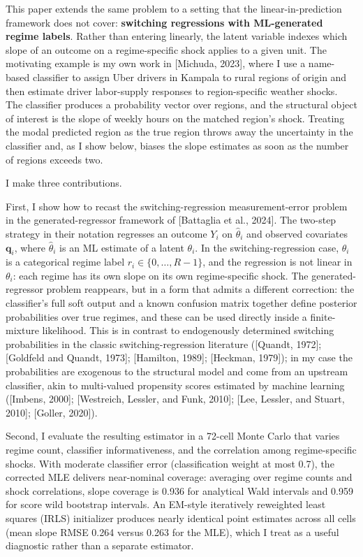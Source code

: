 \documentclass[
  12pt,
  letterpaper]{article}
\begin{document}
This paper extends the same problem to a setting that the
linear-in-prediction framework does not cover: \textbf{switching
regressions with ML-generated regime labels}. Rather than entering
linearly, the latent variable indexes which slope of an outcome on a
regime-specific shock applies to a given unit. The motivating example is
my own work in {[}Michuda, 2023{]}, where I use a name-based classifier
to assign Uber drivers in Kampala to rural regions of origin and then
estimate driver labor-supply responses to region-specific weather
shocks. The classifier produces a probability vector over regions, and
the structural object of interest is the slope of weekly hours on the
matched region's shock. Treating the modal predicted region as the true
region throws away the uncertainty in the classifier and, as I show
below, biases the slope estimates as soon as the number of regions
exceeds two.

I make three contributions.

First, I show how to recast the switching-regression measurement-error
problem in the generated-regressor framework of {[}Battaglia et al.,
2024{]}. The two-step strategy in their notation regresses an outcome
\(Y_i\) on \(\hat\theta_i\) and observed covariates \(\mathbf{q}_i\),
where \(\hat\theta_i\) is an ML estimate of a latent \(\theta_i\). In
the switching-regression case, \(\theta_i\) is a categorical regime
label \(r_i \in \{0,\ldots,R-1\}\), and the regression is not linear in
\(\theta_i\): each regime has its own slope on its own regime-specific
shock. The generated-regressor problem reappears, but in a form that
admits a different correction: the classifier's full soft output and a
known confusion matrix together define posterior probabilities over true
regimes, and these can be used directly inside a finite-mixture
likelihood. This is in contrast to endogenously determined switching
probabilities in the classic switching-regression literature ({[}Quandt,
1972{]}; {[}Goldfeld and Quandt, 1973{]}; {[}Hamilton, 1989{]};
{[}Heckman, 1979{]}); in my case the probabilities are exogenous to the
structural model and come from an upstream classifier, akin to
multi-valued propensity scores estimated by machine learning ({[}Imbens,
2000{]}; {[}Westreich, Lessler, and Funk, 2010{]}; {[}Lee, Lessler, and
Stuart, 2010{]}; {[}Goller, 2020{]}).

Second, I evaluate the resulting estimator in a 72-cell Monte Carlo that
varies regime count, classifier informativeness, and the correlation
among regime-specific shocks. With moderate classifier error
(classification weight at most 0.7), the corrected MLE delivers
near-nominal coverage: averaging over regime counts and shock
correlations, slope coverage is 0.936 for analytical Wald intervals and
0.959 for score wild bootstrap intervals. An EM-style iteratively
reweighted least squares (IRLS) initializer produces nearly identical
point estimates across all cells (mean slope RMSE 0.264 versus 0.263 for
the MLE), which I treat as a useful diagnostic rather than a separate
estimator.
\end{document}
